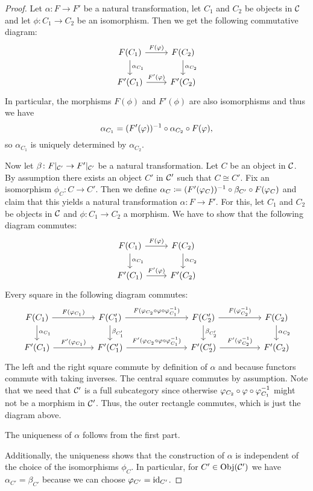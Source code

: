 \begin{proof}
Let $\alpha\colon F \to F'$ be a natural transformation, let $C_1$ and $C_2$ be objects in $\mathcal{C}$ and let $\phi \colon C_1 \to C_2$ be an isomorphism. Then we get the following commutative diagram:
\[
\begin{tikzcd}
F(C_1) \arrow[r, "F(\phi)"] \arrow[d, "\alpha_{C_1}"]  & F(C_2) \arrow[d, "\alpha_{C_2}"] \\
F'(C_1) \arrow[r, "F'(\phi)"]                         & F'(C_2)                        
\end{tikzcd}
\]
In particular, the morphisms $F(\phi)$ and $F'(\phi)$ are also isomorphisms and thus we have \[\alpha_{C_1} = (F'(\varphi))^{-1} \circ \alpha_{C_2} \circ F(\varphi),\] so $\alpha_{C_1}$ is uniquely determined by $\alpha_{C_2}$.

Now let $\beta\colon F\vert_{\mathcal{C}'} \to F'\vert_{\mathcal{C}'}$ be a natural transformation. Let $C$ be an object in $\mathcal{C}$. By assumption there exists an object $C'$ in $\mathcal{C}'$ such that $C \cong C'$. Fix an isomorphism $\phi_C \colon C \to C'$. Then we define $\alpha_C \coloneqq (F'(\varphi_C))^{-1} \circ \beta_{C'} \circ F(\varphi_C)$ and claim that this yields a natural transformation $\alpha\colon F \to F'$. For this, let $C_1$ and $C_2$ be objects in $\mathcal{C}$ and $\phi \colon C_1 \to C_2$ a morphism. We have to show that the following diagram commutes:
\[
\begin{tikzcd}
F(C_1) \arrow[r, "F(\phi)"] \arrow[d, "\alpha_{C_1}"]  & F(C_2) \arrow[d, "\alpha_{C_2}"] \\
F'(C_1) \arrow[r, "F'(\phi)"]                         & F'(C_2)                        
\end{tikzcd}
\]
Every square in the following diagram commutes:
\[
\begin{tikzcd}
F(C_1) \arrow[d, "\alpha_{C_1}"] \arrow[rr, "F(\phi_{C_1})"] &  & F(C_1') \arrow[rrr, "F(\phi_{C_2} \circ \phi \circ \phi_{C_1}\inv)"] \arrow[d, "\beta_{C_1'}"] &  &  & F(C_2') \arrow[rr, "F(\phi_{C_2}\inv)"] \arrow[d, "\beta_{C_2'}"] &  & F(C_2) \arrow[d, "\alpha_{C_2}"] \\
F'(C_1) \arrow[rr, "F'(\phi_{C_1})"]                         &  & F'(C_1') \arrow[rrr, "F'(\phi_{C_2} \circ \phi \circ \phi_{C_1}\inv)"]                         &  &  & F'(C_2') \arrow[rr, "F'(\phi_{C_2}\inv)"]                         &  & F'(C_2)                         
\end{tikzcd}
\]
The left and the right square commute by definition of $\alpha$ and because functors commute with taking inverses. The central square commutes by assumption. Note that we need that $\mathcal{C}'$ is a full subcategory since otherwise $\varphi_{C_2} \circ \varphi \circ \varphi_{C_1}^{-1}$ might not be a morphism in $\mathcal{C}'$. Thus, the outer rectangle commutes, which is just the diagram above.

The uniqueness of $\alpha$ follows from the first part.

Additionally, the uniqueness shows that the construction of $\alpha$ is independent of the choice of the isomorphisms $\phi_C$. In particular, for $C' \in \operatorname{Obj}(\mathcal{C}')$ we have $\alpha_{C'} = \beta_{C'}$ because we can choose $\varphi_{C'} = \operatorname{id}_{C'}$.
\end{proof}

